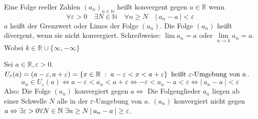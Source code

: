 \documentclass[a4paper,titlepage,oneside]{article}
\def\N{\ensuremath{\mathbb{N}} }
\def\R{\ensuremath{\mathbb{R}} }
\renewcommand{\epsilon}{\ensuremath{\varepsilon} }
\def\sp{\hspace{0,1cm}}
\newcommand{\abs}[1]{\ensuremath{\left|\:#1\:\right|}}
\newcommand{\menge}[2]{\ensuremath{\left\{#1\sp : \sp #2\right\}}}
\theoremstyle{thmstyle}
\begin{document}
\begin{subdefi}
Eine Folge reeller Zahlen \((a_n)_{n\in\N}\) heißt konvergent gegen \( a\in\R\) wenn
\[\forall \epsilon > 0 \quad \exists N \in \N \quad \forall n \ge N \quad \abs{a_n - a} < \epsilon\]
\(a\) heißt der Grenzwert oder Limes der Folge \((a_n)\). Die Folge \((a_n)\) heißt divergent, wenn sie nicht konvergiert. Schreibweise: \(\lim{a_n} = a \) oder \( \lim\limits_{n \to k}{a_n} = a \). Wobei \( k \in \R\cup\{\infty, -\infty\}\)
\end{subdefi}

\begin{subbem}
Sei \(a \in \R, \epsilon > 0\). \(U_\epsilon(a) = (a-\epsilon, a+\epsilon) = \menge{x \in \R}{a - \epsilon < x < a + \epsilon} \text{ heißt } \epsilon\text{-Umgebung von }a\).
\[ a_n \in U_\epsilon(a) \Leftrightarrow a-\epsilon < a_n < a + \epsilon \Leftrightarrow -\epsilon < a_n - a < \epsilon \Leftrightarrow \abs{a_n - a} < \epsilon\]
Also: Die Folge \((a_n)\) konvergiert gegen \(a \Leftrightarrow \) Die Folgenglieder \(a_n\) liegen ab einer Schwelle \(N\) alle in der \(\epsilon\)-Umgebung von \(a\). \((a_n)\) konvergiert nicht gegen \(a \Leftrightarrow \exists \epsilon > 0 \forall N\in\N \sp \exists n \ge N \abs{a_n - a} \ge \epsilon\).
\end{subbem}
\end{document}
